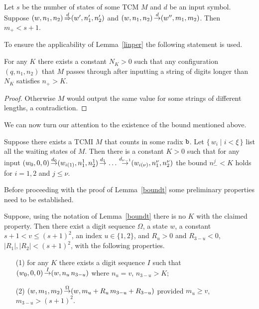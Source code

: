 \documentclass[12pt]{article}
\begin{document}
\begin{corollary}\label{zstg}
Let $s$ be the number of states of some TCM $M$ and $d$ be an input symbol. Suppose
$(w,n_1,n_2)\mathop{\Rightarrow}\limits^{d}(w',n'_1,n'_2)$ and
$(w,n_1,n_2)\mathop{\to}\limits^{d}(w'',m_1,m_2)$. Then $m_+<s+1$.
\end{corollary}

To ensure the applicability of Lemma~\ref{linper} the following
statement is used.
\begin{lemma}\label{lprefix}
For any $K$ there exists a constant $N_K>0$ such that any configuration $(q,n_1,n_2)$
that $M$ passes through after inputting a string of digits longer than
$N_K$ satisfies $n_+>K$.
\end{lemma}
\begin{proof}
Otherwise $M$ would output the same value for some strings of
different lengths, a contradiction.
\end{proof}

We can now turn our attention to the existence of the bound mentioned above.
\def\sgn{\mathop{{\rm sgn}}}
\begin{lemma}\label{boundt}
Suppose there exists a TCMI $M$ that counts in some radix ${\tt b}$. Let
$\{\,w_i\mid i<\xi\,\}$ list all the waiting states of $M$. Then
there is a constant $K>0$ such that for any input
$(w_0,0,0)\mathop{\to}\limits^{d_{0}}(w_{i(1)},n^1_1,n^1_2)\mathop{\to}\limits^{d_{1}}\,\ldots\,\mathop{\to}\limits^{d_{\nu-1}}(w_{i(\nu)},n^\nu_1,n^\nu_2)$
the bound $n^j_-<K$ holds for $i=1,2$ and $j\leq\nu$.
\end{lemma}

Before proceeding with the proof of Lemma~\ref{boundt} some
preliminary properties need to be established.
\begin{lemma}\label{unper}
Suppose, using the notation of Lemma~\ref{boundt} there is no $K$ with
the claimed property. Then there exist a digit sequence $\Omega$, 
a state $w$, a constant $s+1<v\leq(s+1)^2$, an index $u\in\{1,2\}$,
and $R_u>0$ and $R_{3-u}<0$, $|R_1|,|R_2|<(s+1)^2$, with the following
properties. 
\begin{itemize}
\item[(1)] for any $K$ there exists a digit sequence $I$ such that
$(w_0,0,0)\mathop{\to}\limits^{I}(w,n_u\,n_{3-u})$ where $n_u=v$,
$n_{3-u}>K$;

\item[(2)]
$(w,m_1,m_2)\mathop{\to}\limits^{\Omega}(w,m_u+R_u\,m_{3-u}+R_{3-u})$ provided $m_u\geq
v$, $m_{3-u}>(s+1)^2$.

\end{itemize}
\end{lemma}
\end{document}
